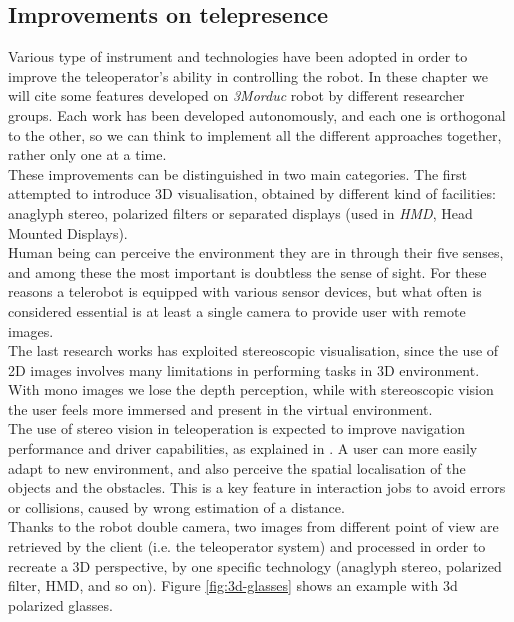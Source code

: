 \subsection{Improvements on telepresence}
\label{sec:improvements_telepresence}

Various type of instrument and technologies have been adopted in order
to improve the teleoperator's ability in controlling the robot. In
these chapter we will cite some features developed on \textit{3Morduc}
robot by different researcher groups. Each work has been developed
autonomously, and each one is orthogonal to the other, so we can think
to implement all the different approaches together, rather only one
at a time.
\\
These improvements can be distinguished in two main categories. The
first attempted to introduce 3D visualisation, obtained by different
kind of facilities: anaglyph stereo, polarized filters or separated
displays (used in \textit{HMD}, Head Mounted Displays).
\\
Human being can perceive the environment they are in through their
five senses, and among these the most important is doubtless the sense
of sight.
For these reasons a telerobot is equipped with various sensor devices,
but what often is considered essential is at least a single camera to
provide user with remote images.
\\
The last research works has exploited stereoscopic visualisation, since
the use of 2D images involves many limitations in performing tasks
in 3D environment. With mono images we lose the depth perception,
while with stereoscopic vision the user feels more immersed and
present in the virtual environment.
\\
The use of stereo vision in teleoperation is expected
to improve navigation performance and driver capabilities, as explained in
\cite{morduc:neri}. A user can more easily adapt to new environment, and
also perceive the spatial localisation of the objects and the obstacles.
This is a key feature in interaction jobs to avoid errors or collisions,
caused by wrong estimation of a distance.
\\
Thanks to the robot double camera, two images from different point of
view are retrieved by the client (i.e. the teleoperator system) and
processed in order to recreate a 3D perspective, by one specific
technology (anaglyph stereo, polarized filter, HMD, and so on).
Figure \ref{fig:3d-glasses} shows an example with 3d polarized
glasses.

